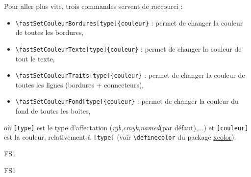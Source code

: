 	Pour aller plus vite, trois commandes servent de raccourci :
	\begin{itemize}
		\item {\color{blue}\verb'\fastSetCouleurBordures[type]{couleur}'} : permet de changer la couleur de toutes les bordures,
		\item {\color{blue}\verb'\fastSetCouleurTexte[type]{couleur}'} : permet de changer la couleur de tout le texte,
		\item {\color{blue}\verb'\fastSetCouleurTraits[type]{couleur}'} : permet de changer la couleur de toutes les lignes (bordures + connecteurs),
		\item {\color{blue}\verb'\fastSetCouleurFond[type]{couleur}'} : permet de changer la couleur du fond de toutes les boites,
	\end{itemize}
	où {\color{blue}\verb'[type]'} est le type d'affectation (\emph{rgb},\emph{cmyk},\emph{named}(par défaut),...)
	et {\color{blue}\verb'[couleur]'} est la couleur, relativement à {\color{blue}\verb'[type]'} (voir {\color{blue}\verb'\definecolor'} du package \href{http://www.ctan.org/tex-archive/macros/latex/contrib/xcolor/}{xcolor}).


\begin{code}
\begin{fast}{FS1}
\end{fast}
\fastReset
\end{code}
\cqd
\begin{exemple}
\begin{fast}{FS1}
\end{fast}
\fastReset
\end{exemple}


